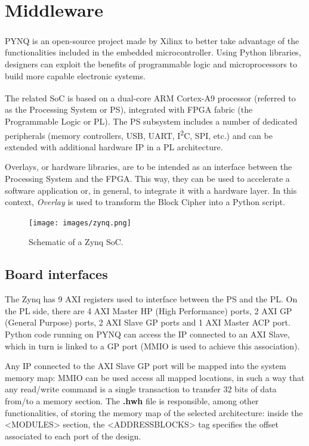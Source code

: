 \section{Middleware}
PYNQ is an open-source project made by Xilinx\textsuperscript{\tiny{\textregistered}} to better take advantage of the functionalities included in the embedded microcontroller.
Using Python libraries, designers can exploit the benefits of programmable logic and microprocessors to build more capable electronic systems.

The related SoC is based on a dual-core ARM\textsuperscript{\tiny{\textregistered}} Cortex\textsuperscript{\tiny{\textregistered}}-A9 processor (referred to as the Processing System or PS), integrated with FPGA fabric (the Programmable Logic or PL).
The PS subsystem includes a number of dedicated peripherals (memory controllers, USB, UART, I\textsuperscript{2}C, SPI, etc.) and can be extended with additional hardware IP in a PL architecture.

Overlays, or hardware libraries, are to be intended as an interface between the Processing System and the FPGA. This way, they can be used to accelerate a software application or, in general, to integrate it with a hardware layer.
In this context, \emph{Overlay} is used to transform the Block Cipher into a Python script.
\begin{figure}[!ht]
\vspace{0.5cm}
\centering
\texttt{[image: images/zynq.png]}
\caption{Schematic of a Zynq SoC.}
\end{figure}
\subsection{Board interfaces}
The Zynq has 9 AXI registers used to interface between the PS and the PL. On the PL side, there are 4 AXI Master HP (High Performance) ports, 2 AXI GP (General Purpose) ports, 2 AXI Slave GP ports and 1 AXI Master ACP port.
Python code running on PYNQ can access the IP connected to an AXI Slave, which in turn is linked to a GP port (MMIO is used to achieve this association).

Any IP connected to the AXI Slave GP port will be mapped into the system memory map: MMIO can be used access all mapped locations, in such a way that any read/write command is a single transaction to transfer 32 bits of data from/to a memory section.
The \textbf{.hwh} file is responsible, among other functionalities, of storing the memory map of the selected architecture: inside the <MODULES> section, the <ADDRESSBLOCKS> tag specifies the offset associated to each port of the design.

